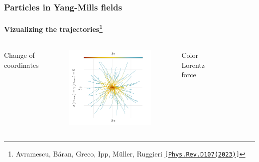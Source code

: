 \documentclass[aspectratio=169,11pt,usenames,dvipsnames]{beamer}
\begin{document}
\begin{frame}[noframenumbering]
    \frametitle{Particles in Yang-Mills fields}
    \framesubtitle{Vizualizing the trajectories\footnote{\scriptsize Avramescu, Băran, Greco, Ipp, Müller, Ruggieri  \href{https://journals.aps.org/prd/abstract/10.1103/PhysRevD.107.114021}{{\color{customblue}\texttt{[Phys.Rev.D107(2023)]}}}}}
    \vspace{-0.5cm}
    \begin{columns}[onlytextwidth,t]
                \begin{center}
                    Change of coordinates 
                \end{center}
                \vspace{-20pt}
                \begin{figure}[!hbt]
                    \centering
                \includegraphics[width=1.1\columnwidth]{images/wong_coord.png}
                \end{figure}
            \begin{center}
                Color Lorentz force
            \end{center}
            \vspace{-20pt}
            \begin{figure}[!hbt]
                \centering

\end{figure}
\end{columns}
\end{frame}
\end{document}
